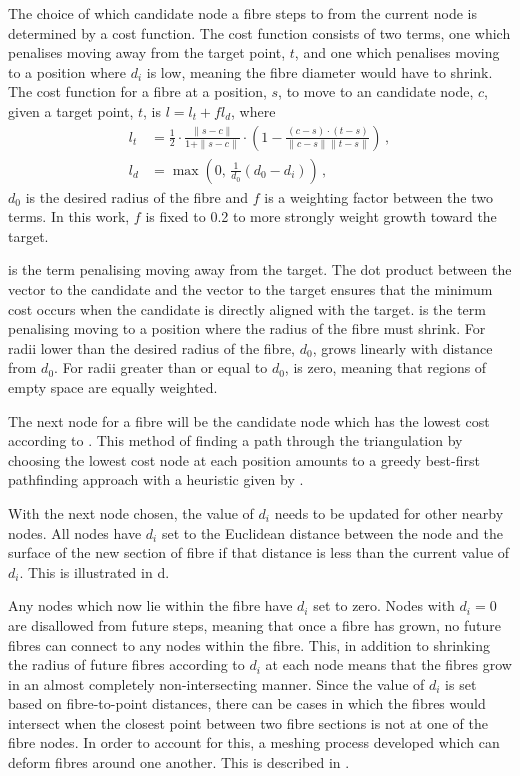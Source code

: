 The choice of which candidate node a fibre steps to from the current node is determined by a cost function. 
The cost function consists of two terms, one which penalises moving away from the target point, $t$, and one which penalises moving to a position where $d_i$ is low, meaning the fibre diameter would have to shrink. The cost function for a fibre at a position, $s$, to move to an candidate node, $c$, given a target point, $t$, is $l = l_t + fl_d$,
where 
\begin{align}
l_t &= \frac{1}{2} \cdot \frac{\|s - c\|}{1 + \|s - c\|} \cdot \left(1 - \frac{(c -s)\cdot(t - s)}{\|c-s\|\|t-s\|}\right)\,,\label{eq:l_t}\\
l_d &= \max\left(0,\, \frac{1}{d_{0}} (d_0 - d_i)\right)\,,\label{eq:l_D}
\end{align}
$d_0$ is the desired radius of the fibre and $f$ is a weighting factor between the two terms. In this work, $f$ is fixed to 0.2 to more strongly weight growth toward the target.

 is the term penalising moving away from the target. The dot product between the vector to the candidate and the vector to the target ensures that the minimum cost occurs when the candidate is directly aligned with the target. 
 is the term penalising moving to a position where the radius of the fibre must shrink. 
For radii lower than the desired radius of the fibre, $d_0$,  grows linearly with distance from $d_0$. 
For radii greater than or equal to $d_0$,  is zero, meaning that regions of empty space are equally weighted.

The next node for a fibre will be the candidate node which has the lowest cost according to .
This method of finding a path through the triangulation by choosing the lowest cost node at each position amounts to a greedy best-first pathfinding approach with a heuristic given by . 

With the next node chosen, the value of $d_i$ needs to be updated for other nearby nodes. 
All nodes have $d_i$ set to the Euclidean distance between the node and the surface of the new section of fibre if that distance is less than the current value of $d_i$. This is illustrated in d.

Any nodes which now lie within the fibre have $d_i$ set to zero. 
Nodes with $d_i = 0$ are disallowed from future steps, meaning that once a fibre has grown, no future fibres can connect to any nodes within the fibre. 
This, in addition to shrinking the radius of future fibres according to $d_i$ at each node means that the fibres grow in an almost completely  non-intersecting manner.
Since the value of $d_i$ is set based on fibre-to-point distances, there can be cases in which the fibres would intersect when the closest point between two fibre sections is not at one of the fibre nodes.
In order to account for this, a meshing process developed which can deform fibres around one another. This is described in .


